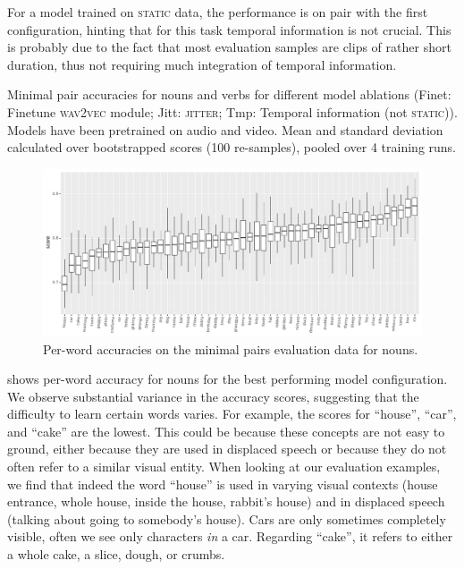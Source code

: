 For a model trained on \textsc{static} data, the performance is on pair with 
the first configuration, hinting that for this task temporal information is not 
crucial. This is probably due to the fact that most evaluation samples are 
clips of rather short duration, thus not requiring much integration of 
temporal information.
\begin{table}[htb]
	
	\caption{Minimal pair accuracies for nouns and verbs for different model 
		ablations (Finet: Finetune \textsc{wav2vec} module; 
		Jitt: \textsc{jitter}; Tmp: Temporal information (not \textsc{static})). 
		Models have been pretrained on audio and video. Mean and standard 
		deviation calculated over bootstrapped scores (100 re-samples), pooled 
		over 4 training runs.}
	\label{tab:minimal_pair_results}
\end{table}


\begin{figure}[htb]
  \centering
  \includegraphics[width=\textwidth]{results/targeted_triplets/acc_per_word_NOUN.pdf}
  \caption{Per-word accuracies on the minimal pairs evaluation data for nouns.}
  \label{fig:accuracy_targeted_triplets_nouns}
\end{figure}

 shows per-word
accuracy for nouns for the best performing model configuration.
We observe substantial variance in the accuracy scores, suggesting that the 
difficulty to learn certain words varies. For example, the 
scores for ``house'', ``car'', and ``cake'' are the lowest. This could be 
because these concepts are not easy to ground, either because they are used in 
displaced speech or because they do not often refer to a similar visual entity. 
When looking at our evaluation examples, we find that indeed the word ``house'' 
is used in varying visual contexts (house entrance, whole house, inside the 
house, rabbit's house) and in displaced speech (talking about going 
to somebody's house). Cars are only sometimes completely visible, often we see 
only characters \textit{in} a car. Regarding ``cake'', it refers to either a 
whole cake, a slice, dough, or crumbs.


